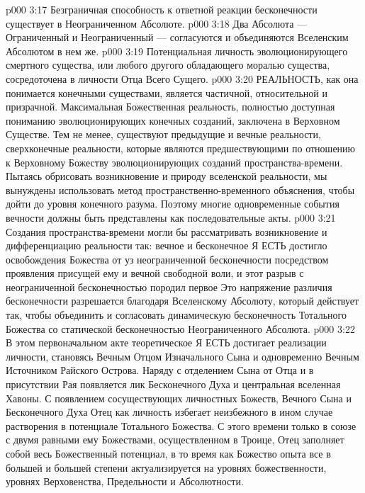 \vs p000 3:17 \bibnobreakspace Безграничная способность к ответной реакции бесконечности существует в Неограниченном Абсолюте.
\vs p000 3:18 \bibnobreakspace Два Абсолюта --- Ограниченный и Неограниченный --- согласуются и объединяются Вселенским Абсолютом в нем же.
\vs p000 3:19 \bibnobreakspace Потенциальная личность эволюционирующего смертного существа, или любого другого обладающего моралью существа, сосредоточена в личности Отца Всего Сущего.
\vs p000 3:20 \pc РЕАЛЬНОСТЬ, как она понимается конечными существами, является частичной, относительной и призрачной. Максимальная Божественная реальность, полностью доступная пониманию эволюционирующих конечных созданий, заключена в Верховном Существе. Тем не менее, существуют предыдущие и вечные реальности, сверхконечные реальности, которые являются предшествующими по отношению к Верховному Божеству эволюционирующих созданий пространства\hyp{}времени. Пытаясь обрисовать возникновение и природу вселенской реальности, мы вынуждены использовать метод пространственно\hyp{}временного объяснения, чтобы дойти до уровня конечного разума. Поэтому многие одновременные события вечности должны быть представлены как последовательные акты.
\vs p000 3:21 Создания пространства\hyp{}времени могли бы рассматривать возникновение и дифференциацию реальности так: вечное и бесконечное Я ЕСТЬ достигло освобождения Божества от уз неограниченной бесконечности посредством проявления присущей ему и вечной свободной воли, и этот разрыв с неограниченной бесконечностью породил первое  Это напряжение различия бесконечности разрешается благодаря Вселенскому Абсолюту, который действует так, чтобы объединить и согласовать динамическую бесконечность Тотального Божества со статической бесконечностью Неограниченного Абсолюта.
\vs p000 3:22 В этом первоначальном акте теоретическое Я ЕСТЬ достигает реализации личности, становясь Вечным Отцом Изначального Сына и одновременно Вечным Источником Райского Острова. Наряду с отделением Сына от Отца и в присутствии Рая появляется лик Бесконечного Духа и центральная вселенная Хавоны. С появлением сосуществующих личностных Божеств, Вечного Сына и Бесконечного Духа Отец как личность избегает неизбежного в ином случае растворения в потенциале Тотального Божества. С этого времени только в союзе с двумя равными ему Божествами, осуществленном в Троице, Отец заполняет собой весь Божественный потенциал, в то время как Божество опыта все в большей и большей степени актуализируется на уровнях божественности, уровнях Верховенства, Предельности и Абсолютности.
